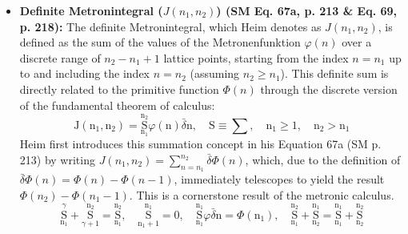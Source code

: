 \documentclass[12pt]{article}
\newcommand{\metronenziffer}{n}
\begin{document}
\begin{itemize}
    \item \textbf{Definite Metronintegral (\( J(n_1, n_2) \)) (SM Eq. 67a, p. 213 \& Eq. 69, p. 218):}
    The definite Metronintegral, which Heim denotes as \( J(n_1, n_2) \), is defined as the sum of the values of the Metronenfunktion \( \varphi(\metronenziffer) \) over a discrete range of \( n_2 - n_1 + 1 \) lattice points, starting from the index \( \metronenziffer = n_1 \) up to and including the index \( \metronenziffer = n_2 \) (assuming \( n_2 \geq n_1 \)). This definite sum is directly related to the primitive function \( \Phi(\metronenziffer) \) through the discrete version of the fundamental theorem of calculus:
    \begin{equation}
    \mathrm{J}(\mathrm{n}_1, \mathrm{n}_2) = \underset{\mathrm{n}_1}{\overset{\mathrm{n}_2}{\mathrm{S}}} \varphi(\mathrm{n})\bar{\delta}\mathrm{n}, \quad \mathrm{S} \equiv \sum, \quad \mathrm{n}_1 \ge 1, \quad \mathrm{n}_2 > \mathrm{n}_1 \tag{67a}
    \label{eq:original_definite_metronintegral}
    \end{equation}
    Heim first introduces this summation concept in his Equation 67a (SM p. 213) by writing \( J(n_1, n_2) = \sum_{\metronenziffer=n_1}^{n_2} \bar{\delta}\Phi(\metronenziffer) \), which, due to the definition of \( \bar{\delta}\Phi(\metronenziffer) = \Phi(\metronenziffer) - \Phi(\metronenziffer-1) \), immediately telescopes to yield the result \( \Phi(n_2) - \Phi(n_1-1) \). This is a cornerstone result of the metronic calculus.
    \begin{equation}
    \underset{\mathrm{n}_1}{\overset{\gamma}{\mathrm{S}}} + \underset{\gamma+1}{\overset{\mathrm{n}_2}{\mathrm{S}}} = \underset{\mathrm{n}_1}{\overset{\mathrm{n}_2}{\mathrm{S}}}, \quad \underset{\mathrm{n}_1+1}{\overset{\mathrm{n}_1}{\mathrm{S}}} = 0, \quad \underset{\mathrm{n}_1}{\overset{\mathrm{n}_1}{\mathrm{S}}} \varphi \bar{\delta}\mathrm{n} = \Phi(\mathrm{n}_1), \quad \underset{\mathrm{n}_1}{\overset{\mathrm{n}_2}{\mathrm{S}}} + \underset{\mathrm{n}_2}{\overset{\mathrm{n}_1}{\mathrm{S}}} = \underset{\mathrm{n}_1}{\overset{\mathrm{n}_1}{\mathrm{S}}} + \underset{\mathrm{n}_2}{\overset{\mathrm{n}_2}{\mathrm{S}}} \tag{69}
    \end{equation}


\end{itemize}
\end{document}
